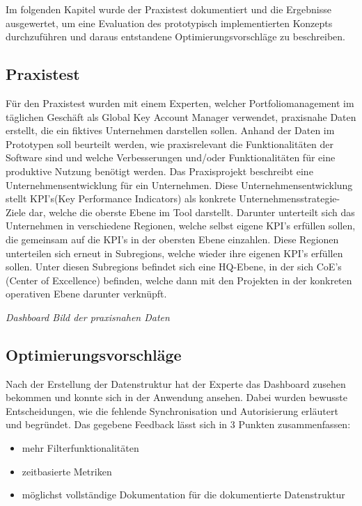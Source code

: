 Im folgenden Kapitel wurde der Praxistest dokumentiert und die Ergebnisse ausgewertet, um eine Evaluation des prototypisch implementierten Konzepts durchzuführen und daraus entstandene Optimierungsvorschläge zu beschreiben.
\subsection{Praxistest}
Für den Praxistest wurden mit einem Experten, welcher Portfoliomanagement im täglichen Geschäft als Global Key Account Manager verwendet, praxisnahe Daten erstellt, die ein fiktives Unternehmen darstellen sollen. Anhand der Daten im Prototypen soll beurteilt werden, wie praxisrelevant die Funktionalitäten der Software sind und welche Verbesserungen und/oder Funktionalitäten für eine produktive Nutzung benötigt werden. Das Praxisprojekt beschreibt eine Unternehmensentwicklung für ein Unternehmen. Diese Unternehmensentwicklung stellt KPI's(Key Performance Indicators) als konkrete Unternehmensstrategie-Ziele dar, welche die oberste Ebene im Tool darstellt. Darunter unterteilt sich das Unternehmen in verschiedene Regionen, welche selbst eigene KPI's erfüllen sollen, die gemeinsam auf die KPI's in der obersten Ebene einzahlen. Diese Regionen unterteilen sich erneut in Subregions, welche wieder ihre eigenen KPI's erfüllen sollen. Unter diesen Subregions befindet sich eine HQ-Ebene, in der sich CoE's (Center of Excellence) befinden, welche dann mit den Projekten in der konkreten operativen Ebene darunter verknüpft.

\emph{Dashboard Bild der praxisnahen Daten}

\subsection{Optimierungsvorschläge}
Nach der Erstellung der Datenstruktur hat der Experte das Dashboard zusehen bekommen und konnte sich in der Anwendung ansehen. Dabei wurden bewusste Entscheidungen, wie die fehlende Synchronisation und Autorisierung erläutert und begründet.
Das gegebene Feedback lässt sich in 3 Punkten zusammenfassen:

\begin{itemize}
    \item mehr Filterfunktionalitäten
    \item zeitbasierte Metriken
    \item möglichst vollständige Dokumentation für die dokumentierte Datenstruktur
\end{itemize}

